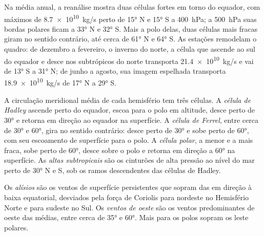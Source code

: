 Na média anual, a reanálise mostra duas células fortes em torno do equador, com máximos de
\qty{8.7e10}{kg/s} perto de \ang{15} N e \ang{15} S a \qty{400}{hPa}; a \qty{500}{hPa} suas bordas
polares ficam a \ang{33} N e \ang{32} S. Mais a polo delas, duas células mais fracas giram no sentido
contrário, até cerca de \ang{61} N e \ang{64} S. As estações remodelam o quadro: de dezembro a
fevereiro, o inverno do norte, a célula que ascende ao sul do equador e desce nos subtrópicos do norte
transporta \qty{21.4e10}{kg/s} e vai de \ang{13} S a \ang{31} N; de junho a agosto, sua imagem
espelhada transporta \qty{18.9e10}{kg/s} de \ang{17} N a \ang{29} S.

\begin{definition}\label{def:b1:atmospheric-circulation:cells}
A circulação meridional média de cada hemisfério tem três células. A \emph{célula de Hadley}
ascende perto do equador, escoa para o polo em altitude, desce perto de \ang{30} e retorna em direção
ao equador na superfície. A \emph{célula de Ferrel}, entre cerca de \ang{30} e
\ang{60}, gira no sentido contrário: desce perto de \ang{30} e sobe perto de \ang{60}, com seu
escoamento de superfície para o polo. A \emph{célula polar}, a menor e a mais fraca,
sobe perto de \ang{60}, desce sobre o polo e retorna em direção a \ang{60} na superfície. As
\emph{altas subtropicais} são os cinturões de alta pressão ao nível do mar
perto de \ang{30} N e S, sob os ramos descendentes das células de Hadley.
\end{definition}

\begin{definition}\label{def:b1:atmospheric-circulation:winds}
Os \emph{alísios} são os ventos de superfície persistentes que sopram das  em direção à baixa equatorial, desviados pela força de Coriolis para nordeste no
Hemisfério Norte e para sudeste no Sul. Os \emph{ventos de oeste} são os
ventos predominantes de oeste das  médias, entre cerca de \ang{35} e \ang{60}. Mais para
os polos sopram os leste polares.
\end{definition}

